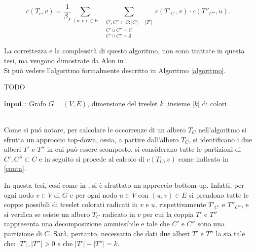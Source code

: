 \begin{equation}\label{conta}
	c(T_c,v)=\frac{1}{\beta_T}\sum_{(u,v)\in E} \;\; \sum_{\substack{C', C'' \subset C : |C'| = |T'| \\C' \cup C'' = C  \\ C' \cap C'' = \emptyset}}c(T'_{C'},v)\cdot c(T''_{C''},u).
\end{equation}

 La correttezza e la complessit\`a di questo algoritmo, non sono trattate in questa tesi, ma vengono dimostrate da Alon in \cite{alon1995color}.\\
 Si pu\`o vedere l'algoritmo formalmente  descritto in Algoritmo \ref{algoritmo}.


\begin{algorithm}[H]
	\caption{TODO}
	\label{algoritmo}
	\SetAlgoLined
 	\textbf{input} : Grafo $ G =(V,E) $, dimensione del treelet $ k $ ,insieme [$ k $] di colori\;	
 			
\end{algorithm}\mbox{}\\

Come si pu\'o notare, per calcolare le occorrenze di un albero $ T_C $ nell'algoritmo si sfrutta un approccio top-down, ossia, a partire dall'albero $ T_C $, si identificano i due alberi $ T' $ e $ T'' $ in cui pu\`o essere scomposto, si considerano tutte le partizioni di $ C',C'' \subset C $ e in seguito si procede al calcolo di $ c(T_C,v) $ come indicato in \eqref{conta}.

In questa tesi, cos\'i come in \cite{bressan2019motivo}, si \`e sfruttato un approccio bottom-up. Infatti, per ogni nodo $ v \in V $ di $ G $ e per ogni nodo $ u \in V$ con $ (u,v)\in E $ si prendono tutte le coppie possibili di treelet colorati radicati  in $ v $ e $ u $, rispettivamente $ T'_{C'} $ e $ T''_{C''} $, e si verifica se esiste un albero $T_C$ radicato in $v$ per cui la coppia  $ T'$ e $ T''$ rappresenta una decomposizione ammissibile e tale che $C'$ e $C''$ sono una partizione di $C$.
Sar\`a, pertanto, necessario che dati due alberi $ T' $ e $ T'' $ la sia tale che: $ |T'|,|T''|>0 $ e che $ |T'| + |T''| = k $. %


